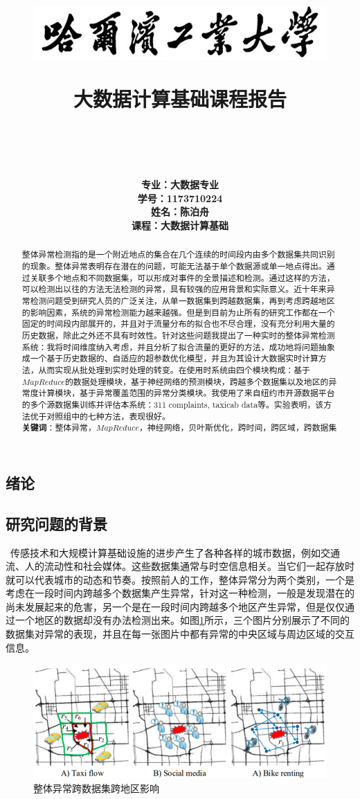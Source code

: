 \documentclass[a4paper, UTF8]{article}
\title{
	\begin{figure}[ht]
	\includegraphics[scale = 1]{hit.jpg}
	\centering
	\end{figure}
	\begin{center}
	\Large{\kaishu 大数据计算基础课程报告}
	\end{center}
	\textbf{\name}\\
}
\author{
	\textbf{专业：大数据专业}\\
	\textbf{学号：1173710224}\\
	\textbf{姓名：陈泊舟}\\
	\textbf{课程：大数据计算基础}\\
}
\begin{document}
\begin{CJK}{UTF8}{gbsn}
\maketitle
\newpage
\CJKindent
\begin{abstract}
整体异常检测指的是一个附近地点的集合在几个连续的时间段内由多个数据集共同识别的现象。整体异常表明存在潜在的问题，可能无法基于单个数据源或单一地点得出。通过关联多个地点和不同数据集，可以形成对事件的全景描述和检测。通过这样的方法，可以检测出以往的方法无法检测的异常，具有较强的应用背景和实际意义。近十年来异常检测问题受到研究人员的广泛关注，从单一数据集到跨越数据集，再到考虑跨越地区的影响因素，系统的异常检测能力越来越强。但是到目前为止所有的研究工作都在一个固定的时间段内部展开的，并且对于流量分布的拟合也不尽合理，没有充分利用大量的历史数据，除此之外还不具有时效性。针对这些问题我提出了一种实时的整体异常检测系统：我将时间维度纳入考虑，并且分析了拟合流量的更好的方法，成功地将问题抽象成一个基于历史数据的、自适应的超参数优化模型，并且为其设计大数据实时计算方法，从而实现从批处理到实时处理的转变。在使用时系统由四个模块构成：基于$MapReduce$的数据处理模块，基于神经网络的预测模块，跨越多个数据集以及地区的异常度计算模块，基于异常覆盖范围的异常分类模块。我使用了来自纽约市开源数据平台的多个源数据集训练并评估本系统：311 complaints, taxicab data等。实验表明，该方法优于对照组中的七种方法，表现很好。\\
\textbf{关键词}：整体异常，$MapReduce$，神经网络，贝叶斯优化，跨时间，跨区域，跨数据集
\end{abstract}
\tableofcontents


\section{绪论}
\subsection{研究问题的背景}
\ 传感技术和大规模计算基础设施的进步产生了各种各样的城市数据，例如交通流、人的流动性和社会媒体。这些数据集通常与时空信息相关。当它们一起存放时就可以代表城市的动态和节奏。按照前人的工作，整体异常分为两个类别，一个是考虑在一段时间内跨越多个数据集产生异常，针对这一种检测，一般是发现潜在的尚未发展起来的危害，另一个是在一段时间内跨越多个地区产生异常，但是仅仅通过一个地区的数据却没有办法检测出来。如图\ref{m-dataset}所示，三个图片分别展示了不同的数据集对异常的表现，并且在每一张图片中都有异常的中央区域与周边区域的交互信息。
\begin{figure}[ht]
\includegraphics[scale = 0.9]{m-dataset.png}
\centering
\caption{整体异常跨数据集跨地区影响}
\label{m-dataset}
\end{figure}

\end{CJK}
\end{document}
